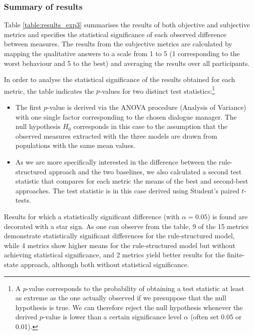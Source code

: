 \subsubsection*{Summary of results}

Table \ref{table:results_exp3} summarises the results of both objective and subjective metrics and specifies the statistical significance of each observed difference between measures.  The results from the subjective metrics are calculated by mapping the qualitative answers to a scale from 1 to 5 (1 corresponding to the worst behaviour and 5 to the best) and averaging the results over all participants. 

In order to analyse the statistical significance of the results obtained for each metric, the table indicates the $p$-values for two distinct test statistics:\footnote{A $p$-value corresponds to the probability of obtaining a test statistic at least as extreme as the one actually observed if we presuppose that the null hypothesis is true.  We can therefore reject the null hypothesis whenever the derived $p$-value is lower than a certain significance level $\alpha$ (often set 0.05 or 0.01).}
\begin{itemize}
\item The first $p$-value is derived via the ANOVA procedure (Analysis of Variance) with one single factor corresponding to the chosen dialogue manager. The null hypothesis $H_0$ corresponds in this case to the assumption that the observed measures extracted with the three models are drawn from populations with the same mean values.  

\item As we are more specifically interested in the difference between the rule-structured approach and the two baselines, we also calculated a second test statistic that compares for each metric the means of the best and second-best approaches. The test statistic is in this case derived using Student's paired $t$-tests.

\end{itemize}

Results for which a statistically significant difference (with $\alpha = 0.05$) is found are decorated with a star sign. As one can observe from the table, 9 of the 15 metrics demonstrate statistically significant differences for the rule-structured model, while 4 metrics show higher means for the rule-structured model but without achieving statistical significance, and 2 metrics yield better results for the finite-state approach, although both without statistical significance. 

